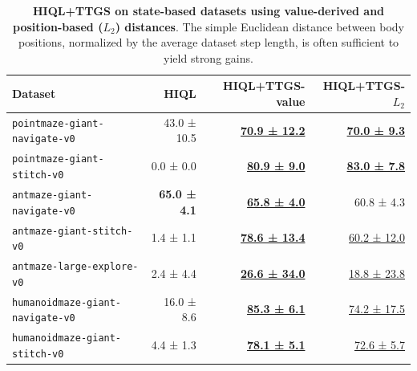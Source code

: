 \documentclass{article} %
\begin{document}
\begin{table}[t!]
    \centering
    \small
    \setlength{\tabcolsep}{6pt}
    \caption{\textbf{HIQL+TTGS on state-based datasets using value-derived and position-based ($L_2$) distances}. The simple Euclidean distance between body positions, normalized by the average dataset step length, is often sufficient to yield strong gains.}
    \label{tab:l2_distance}
    \begin{tabular*}{\linewidth}{@{\extracolsep{\fill}}lrrr}
      \toprule
      \textbf{Dataset} & HIQL & HIQL+TTGS-value & HIQL+TTGS-$L_2$
      \\
      \toprule
      \texttt{pointmaze-giant-navigate-v0}
        & 43.0 ± 10.5 & \underline{\textbf{70.9 ± 12.2}} & \underline{\textbf{70.0 ± 9.3}}\\
    \texttt{pointmaze-giant-stitch-v0}
        & 0.0 ± 0.0 & \underline{\textbf{80.9 ± 9.0}} & \underline{\textbf{83.0 ± 7.8}}\\
    \texttt{antmaze-giant-navigate-v0}
        & \textbf{65.0 ± 4.1} & \underline{\textbf{65.8 ± 4.0}} & 60.8 ± 4.3 \\
      \texttt{antmaze-giant-stitch-v0}
        & 1.4 ± 1.1 & \underline{\textbf{78.6 ± 13.4}} & \underline{60.2 ± 12.0} \\
    \texttt{antmaze-large-explore-v0}
        & 2.4 ± 4.4 & \underline{\textbf{26.6 ± 34.0}} & \underline{18.8 ± 23.8} \\
    \texttt{humanoidmaze-giant-navigate-v0}
        & 16.0 ± 8.6 & \underline{\textbf{85.3 ± 6.1}} & \underline{74.2 ± 17.5} \\
    \texttt{humanoidmaze-giant-stitch-v0}
        & 4.4 ± 1.3 & \underline{\textbf{78.1 ± 5.1}} & \underline{72.6 ± 5.7} \\
    \bottomrule
    \end{tabular*}
\end{table}
\end{document}

